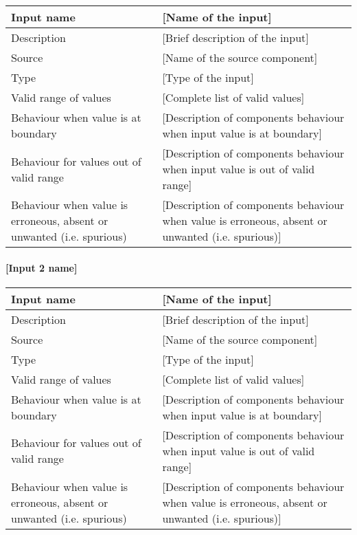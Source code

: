 \begin{longtable}{p{}p{}}
\toprule
Input name				& [Name of the input] \\
\midrule
Description				& [Brief description of the input] \\
\midrule
Source					& [Name of the source component] \\ 
\midrule
Type					& [Type of the input] \\
\midrule
Valid range of values	& [Complete list of valid values] \\
\midrule
Behaviour when value is at boundary	& [Description of components behaviour when input value is at boundary] \\
\midrule
Behaviour for values out of valid range	& [Description of components behaviour when input value is out of valid range] \\
\midrule
Behaviour when value is erroneous, absent or unwanted (i.e. spurious) & [Description of components behaviour when value is erroneous, absent or unwanted (i.e. spurious)] \\
\bottomrule
\end{longtable}

\paragraph{[Input 2 name]}

\begin{longtable}{p{}p{}}
\toprule
Input name				& [Name of the input] \\
\midrule
Description				& [Brief description of the input] \\
\midrule
Source					& [Name of the source component] \\ 
\midrule
Type					& [Type of the input] \\
\midrule
Valid range of values	& [Complete list of valid values] \\
\midrule
Behaviour when value is at boundary	& [Description of components behaviour when input value is at boundary] \\
\midrule
Behaviour for values out of valid range	& [Description of components behaviour when input value is out of valid range] \\
\midrule
Behaviour when value is erroneous, absent or unwanted (i.e. spurious) & [Description of components behaviour when value is erroneous, absent or unwanted (i.e. spurious)] \\
\bottomrule
\end{longtable}



